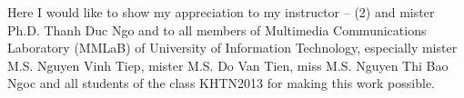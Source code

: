 
Here I would like to show my appreciation to my instructor – \instructor(2) and mister Ph.D. Thanh Duc Ngo and to all members of Multimedia Communications Laboratory (MMLaB) of University of Information Technology, especially mister M.S. Nguyen Vinh Tiep, mister M.S. Do Van Tien, miss M.S. Nguyen Thi Bao Ngoc and all students of the class KHTN2013 for making this work possible. 